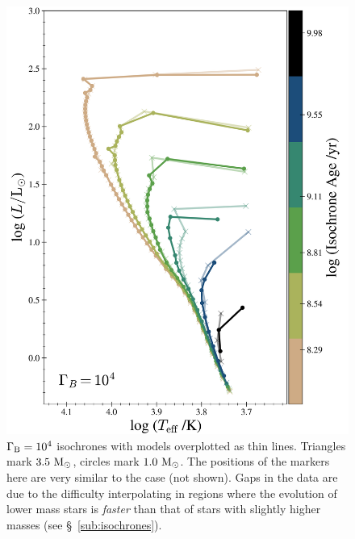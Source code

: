 \documentclass[useAMS,usenatbib]{mnras}
\begin{document}
\begin{figure}
  \centering
  \includegraphics[width=\textwidth]{plots/isos_cb4.png}
  \caption{$\Gamma_\mathrm{B} = 10^{4}$ isochrones with \nodm models overplotted as thin lines. Triangles mark $3.5 \ \mathrm{M}_{\odot}$, circles mark $1.0 \ \mathrm{M}_{\odot}$. The positions of the markers here are very similar to the \nodm case (not shown). Gaps in the data are due to the difficulty interpolating in regions where the evolution of lower mass stars is \textit{faster} than that of stars with slightly higher masses (see \S~\ref{sub:isochrones}).
  }
  \label{fig:isos_cb4}
\end{figure}
\end{document}
